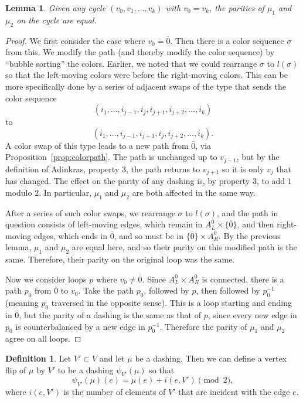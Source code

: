 \documentclass[12pt,twoside,singlespace]{article}
\numberwithin{equation}{section}
\newtheorem{lem}[equation]{Lemma}
\theoremstyle{definition}
\newtheorem{definition}[equation]{Definition}
\begin{document}
\begin{lem}
Given any cycle $(v_0,v_1,\ldots,v_k)$ with $v_0=v_k$, the parities of $\mu_1$ and $\mu_2$ on the cycle are equal.
\end{lem}
\begin{proof}
We first consider the case where $v_0=\overline{0}$.  Then there is a color sequence $\sigma$ from this.  We modify the path (and thereby modify the color sequence) by ``bubble sorting'' the colors.  Earlier, we noted that we could rearrange $\sigma$ to $l(\sigma)$ so that the left-moving colors were before the right-moving colors.  This can be more specifically done by a series of adjacent swaps of the type that sends the color sequence
\[(i_1,\ldots,i_{j-1},i_j,i_{j+1},i_{j+2},\ldots,i_k)\]
to
\[(i_1,\ldots,i_{j-1},i_{j+1},i_j,i_{j+2},\ldots,i_k).\]
A color swap of this type leads to a new path from $\overline{0}$, via Proposition~\ref{prop:colorpath}.  The path is unchanged up to $v_{j-1}$, but by the definition of Adinkras, property 3, the path returns to $v_{j+1}$ so it is only $v_j$ that has changed.  The effect on the parity of any dashing is, by property 3, to add $1$ modulo $2$.  In particular, $\mu_1$ and $\mu_2$ are both affected in the same way.

After a series of such color swaps, we rearrange $\sigma$ to $l(\sigma)$, and the path in question consists of left-moving edges, which remain in $A_L^0\times \{\overline{0}\}$, and then right-moving edges, which ends in $\overline{0}$, and so must be in $\{\overline{0}\}\times A_R^0$.  By the previous lemma, $\mu_1$ and $\mu_2$ are equal here, and so their parity on this modified path is the same.  Therefore, their parity on the original loop was the same.

Now we consider loops $p$ where $v_0\not=\overline{0}$.  Since $A_L^0\times A_R^0$ is connected, there is a path $p_0$ from $\overline{0}$ to $v_0$.  Take the path $p_0$, followed by $p$, then followed by $p_0^{-1}$ (meaning $p_0$ traversed in the opposite sense).  This is a loop starting and ending in $\overline{0}$, but the parity of a dashing is the same as that of $p$, since every new edge in $p_0$ is counterbalanced by a new edge in $p_0^{-1}$.  Therefore the parity of $\mu_1$ and $\mu_2$ agree on all loops.
\end{proof}

\begin{definition}
Let $V'\subset V$ and let $\mu$ be a dashing.  Then we can define a vertex flip of $\mu$ by $V'$ to be a dashing $\psi_{V'}(\mu)$ so that
\[\psi_{V'}(\mu)(e)=\mu(e)+i(e,V')\pmod{2},\]
where $i(e,V')$ is the number of elements of $V'$ that are incident with the edge $e$.
\end{definition}
\end{document}
